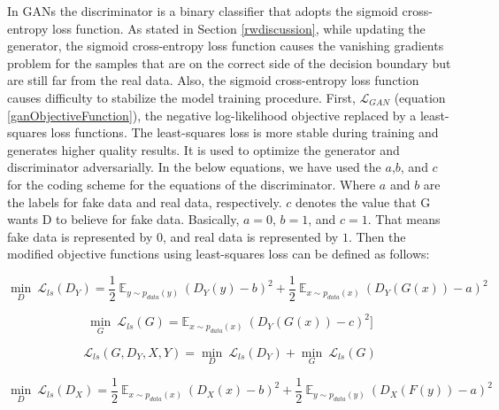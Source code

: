 In \acp{GAN} the discriminator is a binary classifier that adopts the sigmoid cross-entropy loss function. As stated in Section \ref{rwdiscussion}, while updating the generator, the sigmoid cross-entropy loss function causes the vanishing gradients problem for the samples that are on the correct side of the decision boundary but are still far from the real data.  Also, the sigmoid cross-entropy loss function causes difficulty to stabilize the model training procedure\cite{mao2017squares}. First, $\mathcal{L}_{GAN}$ (equation \ref{ganObjectiveFunction}), the negative log-likelihood objective replaced by a least-squares loss functions\cite{mao2017squares}. The least-squares loss is more stable during training and generates higher quality results\cite{mao2017squares}. It is used to optimize the generator and discriminator adversarially. In the below equations, we have used the $a$,$b$, and $c$ for the coding scheme for the equations of the discriminator. Where $a$ and $b$ are the labels for fake data and real data, respectively. $c$ denotes the value that G wants D to believe for fake data. Basically, $a = 0$, $b = 1$, and $c = 1$. That means fake data is represented by $0$, and real data is represented by $1$. Then the modified objective functions using least-squares loss can be defined as follows:

    \begin{equation}\label{lsgan1}
        \underset{D}{\min}\ \mathcal{L}_{ls}(D_Y) = \frac{1}{2}\ \mathbb{E}_{y \sim p_{data}(y)}\ (D_Y(y) - b)^2 + 
        \frac{1}{2}\ \mathbb{E}_{x \sim p_{data}(x)}\ (D_Y(G(x)) - a)^2
    \end{equation}
    
    \begin{equation}\label{lsgan2}
        \underset{G}{\min}\ \mathcal{L}_{ls}(G) = \mathbb{E}_{x \sim p_{data}(x)}\ (D_Y(G(x)) - c)^2]
    \end{equation}
    
    \begin{equation}\label{lsgan3}
    \mathcal{L}_{ls}(G, D_Y, X, Y) =  \underset{D}{\min}\ \mathcal{L}_{ls}(D_Y) + \underset{G}{\min}\ \mathcal{L}_{ls}(G)
    \end{equation}
    
    \begin{equation}\label{lsgan4}
        \underset{D}{\min}\ \mathcal{L}_{ls}(D_X) = \frac{1}{2}\ \mathbb{E}_{x \sim p_{data}(x)}\ (D_X(x) - b)^2 + 
        \frac{1}{2}\ \mathbb{E}_{y \sim p_{data}(y)}\ (D_X(F(y)) - a)^2
    \end{equation}
    
